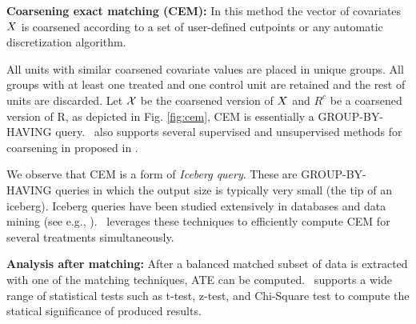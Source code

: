 {\bf Coarsening exact matching (CEM):} In this method the vector of covariates ${{X}}$ is
coarsened according to a set of user-defined cutpoints or any
automatic discretization algorithm.
All units with similar coarsened
covariate values are placed in unique groups. All
groups with at least one treated and one control unit are retained
and the rest of units are discarded.  Let ${{\mathcal{X}}}$ be the
coarsened version of ${{X}}$ and $R^c$ be a coarsened
version of R, as depicted in Fig. \ref{fig:cem},
CEM is essentially a GROUP-BY-HAVING query.
 \GSQL\  also supports several supervised and unsupervised methods for coarsening in proposed in \cite{dougherty1995supervised}.

We observe that CEM is  a form of {\em Iceberg query}.  These are  GROUP-BY-HAVING queries in which the output size is typically very small (the
tip of an iceberg). Iceberg queries have been studied extensively in databases and data mining (see e.g.,
\cite{fang1999computing,findlater2003iceberg}).
\GSQL\ leverages these techniques to efficiently compute CEM for several treatments simultaneously.



{\bf Analysis after matching:} After a balanced matched subset of data is extracted with one of the
matching techniques, ATE can be computed.
\GSQL\  supports a wide range of statistical tests such as t-test, z-test, and Chi-Square test
to compute the statical significance of produced results.






